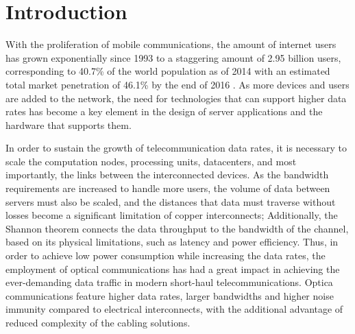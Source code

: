 
\chapter{Introduction}
\label{ch:Introduction}

With the proliferation of mobile communications, the amount of internet users has grown exponentially since 1993 to a staggering amount of 2.95 billion users, corresponding to 40.7\% of the world population as of 2014 \cite{ITUinfo15} with an estimated total market penetration of 46.1\% by the end of 2016 \cite{ILSinfo16}. As more devices and users are added to the network, the need for technologies that can support higher data rates has become a key element in the design of server applications and the hardware that supports them. 
\par\medskip
In order to sustain the growth of telecommunication data rates, it is necessary to scale the computation nodes, processing units, datacenters, and most importantly, the links between the interconnected devices. As the bandwidth requirements are increased to handle more users, the volume of data between servers must also be scaled, and the distances that data must traverse without losses become a significant limitation of copper interconnects; Additionally, the Shannon theorem connects the data throughput to the bandwidth of the channel, based on its physical limitations, such as latency and power efficiency. Thus, in order to achieve low power consumption while increasing the data rates, the employment of optical communications has had a great impact in achieving the ever-demanding data traffic in modern short-haul telecommunications. Optica communications feature higher data rates, larger bandwidths and higher noise immunity compared to electrical interconnects, with the additional advantage of reduced complexity of the cabling solutions.
\par\medskip
